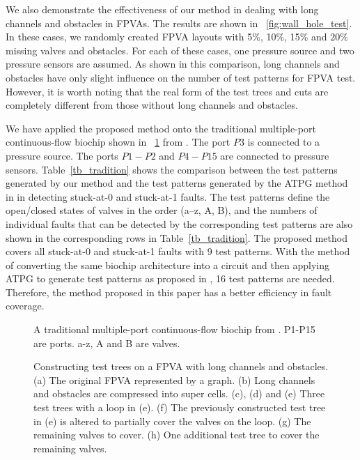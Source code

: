 We also 
demonstrate the effectiveness of our method in dealing with long channels
and obstacles in FPVAs. The results are shown in
\figname~\ref{fig:wall_hole_test}. In these cases, we randomly
created FPVA layouts with 5\%, 10\%, 15\% and 20\% missing valves and
obstacles. For each of these cases, one pressure source and two pressure sensors are 
assumed.
As shown in this comparison, long channels and obstacles 
have only slight influence on the number of test patterns for FPVA test.
However, it is worth noting that the real form of the test trees and cuts are
completely different from those without long channels and obstacles. 

We have applied the proposed method onto the traditional multiple-port
continuous-flow biochip shown 
in \figname~\ref{fig:test_traditional} from \cite{HuYHC14}. The port $P3$
is connected to a pressure source. The ports $P1-P2$ and $P4-P15$ are connected
to pressure sensors. 
Table~\ref{tb_tradition} shows the comparison between the test patterns generated by our
method and the test patterns generated by the ATPG method in \cite{HuYHC14} in
detecting stuck-at-0 and stuck-at-1 faults.
The test patterns define the open/closed states
of valves in the order (a--z, A, B), and the numbers of
individual faults that can be detected by the corresponding test patterns are
also shown in the corresponding rows in Table~\ref{tb_tradition}.
The proposed method covers all stuck-at-0 and stuck-at-1 faults with 9 test patterns. 
With the method of converting the same biochip architecture into a circuit 
and then applying ATPG to generate test patterns as proposed in \cite{HuYHC14}, 
16 test patterns are needed. Therefore, the method proposed in this paper has a
better efficiency in fault coverage. 


 \begin{figure}[t]
 {\figurefontsize
 \centering
 
 \caption{A traditional multiple-port continuous-flow biochip from \cite{HuYHC14}. P1-P15 are ports. a-z, A and B are valves.}
 \label{fig:test_traditional}
 }
 \end{figure}

\begin{figure*}
{\figurefontsize
\centering

\caption{Constructing test trees on a  FPVA with long
channels and obstacles. (a) The original FPVA represented by a graph. (b) Long
channels and obstacles are compressed into super cells. (c), (d) and (e) Three test trees
with a loop in (e).
(f) The previously constructed test tree in (e) is altered to partially
cover the valves on the loop. (g) The remaining valves to cover. (h) One
additional test tree to cover the remaining valves.}
\label{fig:kill_loops_example}
}
\end{figure*}
 
